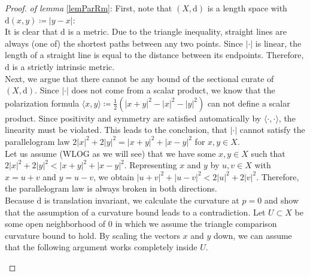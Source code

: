 \documentclass[11pt, a4paper]{article} %
\newcommand{\dd}{\text{d}} %
\theoremstyle{plain} %
\newcommand{\mDef}{\coloneqq }
\begin{document}
\begin{proof} \textit{of lemma} \ref{lemParRm}: 
First, note that $(X,\dd)$ is a length space with $\dd(x,y)\mDef|y-x|$:\\ It is clear that $\dd$ is a metric.
Due to the triangle inequality, straight lines are always (one of) the shortest paths between any two points. Since $|\cdot|$ is linear, the length of a straight line is equal to the distance between its endpoints. Therefore, $\dd$ is a strictly intrinsic metric.\\
Next, we argue that there cannot be any bound of the sectional curate of $(X,\dd)$.
Since $|\cdot|$ does not come from a scalar product, we know that the polarization formula $\langle x,y\rangle \mDef \frac{1}{2}\left(|x+y|^2 -|x|^2 - |y|^2\right)$ can not define a scalar product. Since positivity and symmetry are satisfied automatically by $\langle \cdot,\cdot\rangle$, the linearity must be violated. This leads to the conclusion, that $|\cdot|$ cannot satisfy the parallelogram law $2|x|^2 + 2 |y|^2 = |x+y|^2 + |x-y|^2$ for $x,y\in X$.\\
Let us assume (WLOG as we will see) that we have some $x,y\in X$ such that\\ $2|x|^2 + 2 |y|^2 < |x+y|^2 + |x-y|^2$. Representing $x$ and $y$ by $u, v \in X$ with $x=u+v$ and $y=u-v$, we obtain $|u+v|^2 + |u-v|^2 < 2 |u|^2 + 2|v|^2$. Therefore, the parallelogram law is always broken in both directions. \\
Because $\dd$ is translation invariant, we calculate the curvature at $p=0$ and show that the assumption of a curvature bound leads to a contradiction.
Let $U\subset X$ be some open neighborhood of $0$ in which we assume the triangle comparison curvature bound to hold.
By scaling the vectors $x$ and $y$ down, we can assume that the following argument works completely inside $U$.
\begin{center}
\end{center}
\end{proof}
\end{document}

